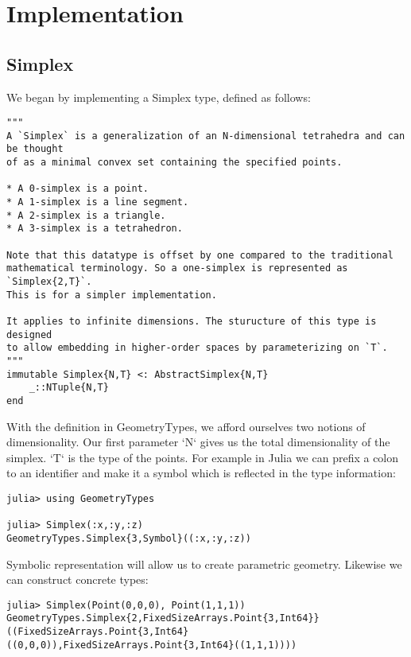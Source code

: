 \chapter{Implementation}

\section{Simplex}

We began by implementing a Simplex type, defined as follows:

\begin{lstlisting}
"""
A `Simplex` is a generalization of an N-dimensional tetrahedra and can be thought
of as a minimal convex set containing the specified points.

* A 0-simplex is a point.
* A 1-simplex is a line segment.
* A 2-simplex is a triangle.
* A 3-simplex is a tetrahedron.

Note that this datatype is offset by one compared to the traditional
mathematical terminology. So a one-simplex is represented as `Simplex{2,T}`.
This is for a simpler implementation.

It applies to infinite dimensions. The sturucture of this type is designed
to allow embedding in higher-order spaces by parameterizing on `T`.
"""
immutable Simplex{N,T} <: AbstractSimplex{N,T}
    _::NTuple{N,T}
end
\end{lstlisting}

With the definition in GeometryTypes, we afford ourselves two notions of
dimensionality. Our first parameter `N` gives us the total dimensionality
of the simplex. `T` is the type of the points. For example in Julia we can
prefix a colon to an identifier and make it a symbol which is reflected
in the type information:

\begin{lstlisting}
julia> using GeometryTypes

julia> Simplex(:x,:y,:z)
GeometryTypes.Simplex{3,Symbol}((:x,:y,:z))
\end{lstlisting}

Symbolic representation will allow us to create parametric geometry.
Likewise we can construct concrete types:

\begin{lstlisting}
julia> Simplex(Point(0,0,0), Point(1,1,1))
GeometryTypes.Simplex{2,FixedSizeArrays.Point{3,Int64}}((FixedSizeArrays.Point{3,Int64}((0,0,0)),FixedSizeArrays.Point{3,Int64}((1,1,1))))
\end{lstlisting}

